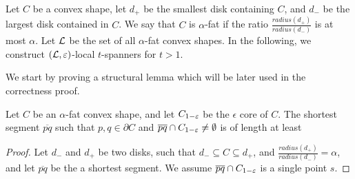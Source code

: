 \documentclass[12pt]{article}%
\begin{document}
Let $C$ be a convex shape, let $d_+$ be the smallest disk containing $C$, and $d_-$ be the largest disk contained in $C$. We say that $C$ is $\alpha$-fat if the ratio $\frac{radius(d_+)}{radius(d_-)}$ is at most $\alpha$. Let $\mathcal{L}$ be the set of all $\alpha$-fat convex shapes. In the following, we construct $(\mathcal{L}, \varepsilon)$-local $t$-spanners for $t>1$. 

We start by proving a structural lemma which will be later used in the correctness proof.

\begin{claim}
	Let $C$ be an $\alpha$-fat convex shape, and let $C_{1-\varepsilon}$ be the $\epsilon$ core of $C$. The shortest segment $\overline{pq}$ such that $p,q\in\partial C$ and $\overline{pq}\cap C_{1-\varepsilon}\neq \emptyset$ is of length at least %
\end{claim}

\begin{proof}
	Let $d_-$ and $d_+$ be two disks, such that $d_-\subseteq C\subseteq d_+$, and $\frac{radius(d_+)}{radius(d_-)}=\alpha$, and let $\overline{pq}$ be the a shortest segment. We assume $\overline{pq} \cap C_{1-\varepsilon}$ is a single point $s$.
\end{proof}


 
%

\end{document}
